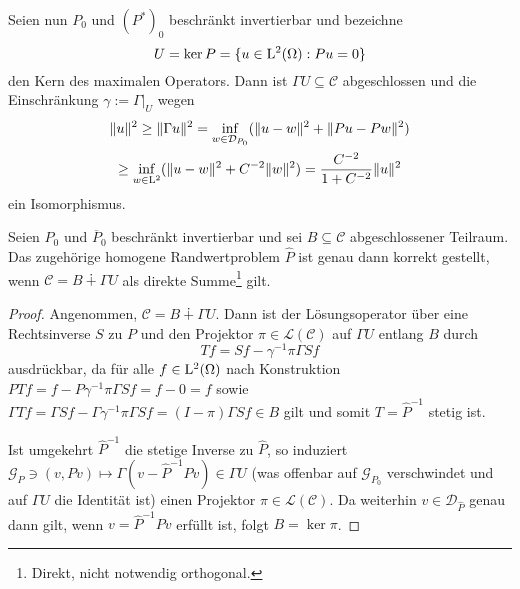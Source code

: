 Seien nun $P_0$ und  $(P^*)_0$ beschränkt invertierbar und bezeichne 
\begin{equation}
  U=\ker P = \{u\in\mathrm L^2(\Omega) : Pu =0\}
\end{equation}  
den Kern des maximalen Operators. Dann ist $\Gamma U\subseteq \mathcal C$ abgeschlossen und die Einschränkung $\gamma:=\Gamma|_U$ wegen
\begin{multline}
  \|u\|^2\ge \|\Gamma u\|^2 = \inf_{w\in \mathcal D_{P_0}} (\|u-w\|^2 + \|Pu - Pw\|^2) \\   \ge \inf_{w\in \mathrm L^2} (\|u-w\|^2 + C^{-2} \|w\|^2) = \frac{C^{-2}}{1+C^{-2}}\|u\|^2
\end{multline}
ein Isomorphismus. 
\begin{thm}
Seien $P_0$ und $\overline  P_0$ beschränkt invertierbar und sei $B\subseteq\mathcal C$ abgeschlossener Teilraum. Das zugehörige homogene Randwertproblem $\widehat P$ ist genau dann korrekt gestellt, wenn $\mathcal C = B \dotplus \Gamma U $ als direkte Summe\footnote{Direkt, nicht notwendig orthogonal.} gilt.
\end{thm}
\begin{proof}
Angenommen, $\mathcal C = B \dotplus \Gamma U$. Dann ist der Lösungsoperator über eine Rechtsinverse $S$ zu $P$ und den Projektor $\pi\in\mathcal L(\mathcal C)$ auf  $\Gamma U$ entlang $B$ durch
\begin{equation}
     Tf = Sf-\gamma^{-1}\pi\Gamma Sf
\end{equation}
ausdrückbar, da für alle $f\in\mathrm L^2(\Omega)$ nach Konstruktion $PTf=f-P \gamma^{-1}\pi\Gamma S f=f-0=f$ sowie $\Gamma T f=\Gamma Sf - \Gamma\gamma^{-1}\pi \Gamma Sf=(I-\pi)\Gamma Sf\in B$ gilt und somit $T=\widehat P^{-1}$ stetig ist.  

Ist umgekehrt $\widehat P^{-1}$ die stetige Inverse zu $\widehat P$, so induziert
$\mathcal G_P\ni(v,Pv) \mapsto \Gamma(v-\widehat P^{-1}Pv)\in\Gamma U$ (was offenbar auf $\mathcal G_{P_0}$ verschwindet und auf $\Gamma U$ die Identität ist) einen Projektor $\pi\in\mathcal L(\mathcal C)$. Da weiterhin $v\in\mathcal D_{\widehat P}$ genau dann gilt, wenn $v=\widehat P^{-1}Pv$ erfüllt ist, folgt $B=\ker\pi$.
\end{proof}

